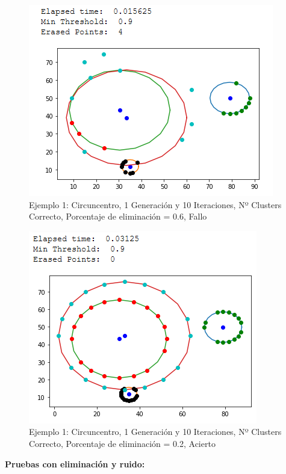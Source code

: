\documentclass[conference,a4paper]{IEEEtran}
\begin{document}
\begin{figure}[H]
\centering
\includegraphics[scale=0.65]{Experimentacion/Ejemplo1/ej1_c_1_10_me_wrong}
\caption{Ejemplo 1: Circuncentro, 1 Generación y 10 Iteraciones,  Nº Clusters Correcto, Porcentaje de eliminación = 0.6, Fallo\\}
\end{figure}

\begin{figure}[H]
\centering
\includegraphics[scale=0.65]{Experimentacion/Ejemplo1/ej1_c_1_10_le}
\caption{Ejemplo 1: Circuncentro, 1 Generación y 10 Iteraciones,  Nº Clusters Correcto, Porcentaje de eliminación = 0.2, Acierto\\}
\end{figure}

\newpage
\textbf{Pruebas con eliminación y ruido:}\\
\end{document}
